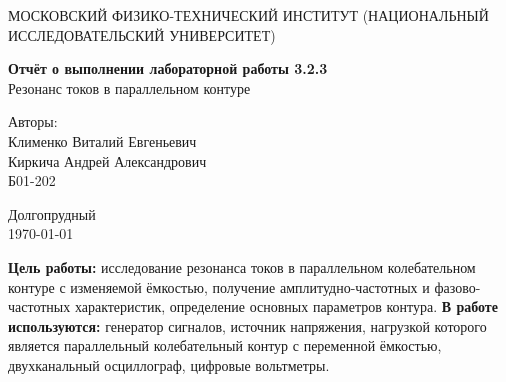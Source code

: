 


\begin{titlepage}
	\begin{center}
		{\large МОСКОВСКИЙ ФИЗИКО-ТЕХНИЧЕСКИЙ ИНСТИТУТ (НАЦИОНАЛЬНЫЙ ИССЛЕДОВАТЕЛЬСКИЙ УНИВЕРСИТЕТ)}
	\end{center}
	
	\vspace{4.5cm}
	{\huge
		\begin{center}
			{\bf Отчёт о выполнении лабораторной работы 3.2.3}\\
			Резонанс токов в параллельном контуре
		\end{center}
	}
	\vspace{2cm}
	\begin{flushright}
		{\LARGE Авторы:\\ Клименко Виталий Евгеньевич \\ Киркича Андрей Александрович \\
			\vspace{0.2cm}
			Б01-202}
	\end{flushright}
	\vspace{3.8cm}
	\begin{center}
		Долгопрудный\\
		\today
	\end{center}
\end{titlepage}
\n
	\textbf{Цель работы: }
	исследование резонанса токов в параллельном колебательном контуре с изменяемой ёмкостью, получение амплитудно-частотных и фазово-частотных характеристик, определение основных параметров контура.
	\n\n
	\textbf{В работе используются: }
	генератор сигналов, источник напряжения, нагрузкой которого является параллельный колебательный контур с переменной ёмкостью, двухканальный осциллограф, цифровые вольтметры.
